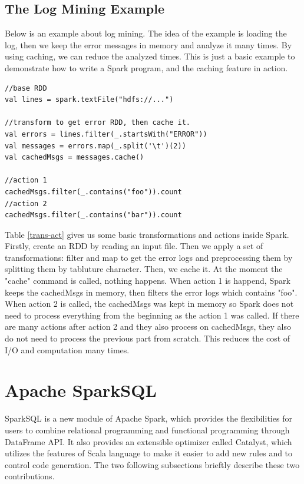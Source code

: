 \subsection{The Log Mining Example}

Below is an example about log mining. The idea of the example is loading the log, then we keep the error messages in memory and analyze it many times. By using caching, we can reduce the analyzed times. This is just a basic example to demonstrate how to write a Spark program, and the caching feature in action.

\begin{lstlisting}
//base RDD
val lines = spark.textFile("hdfs://...")

//transform to get error RDD, then cache it.
val errors = lines.filter(_.startsWith("ERROR"))
val messages = errors.map(_.split('\t')(2))
val cachedMsgs = messages.cache()

//action 1
cachedMsgs.filter(_.contains("foo")).count
//action 2
cachedMsgs.filter(_.contains("bar")).count
\end{lstlisting}

Table \ref{trans-act} gives us some basic transformations and actions inside Spark.\\

Firstly, create an RDD by reading an input file. Then we apply a set of transformations: filter and map to get the error logs and preprocessing them by splitting them by tabluture character. Then, we cache it. At the moment the "cache" command is called, nothing happens. When action 1 is happend, Spark keeps the cachedMsgs in memory, then filters the error logs which contains "foo". When action 2 is called, the cachedMsgs was kept in memory so Spark does not need to process everything from the beginning as the action 1 was called. If there are many actions after action 2 and they also process on cachedMsgs, they also do not need to process the previous part from scratch. This reduces the cost of I/O and computation many times.


\section{Apache SparkSQL}
SparkSQL is a new module of Apache Spark, which provides the flexibilities for users to combine relational programming and functional programming through DataFrame API. It also provides an extensible optimizer called Catalyst, which utilizes the features of Scala language to make it easier to add new rules and to control code generation. The two following subsections brieftly describe these two contributions.\\


